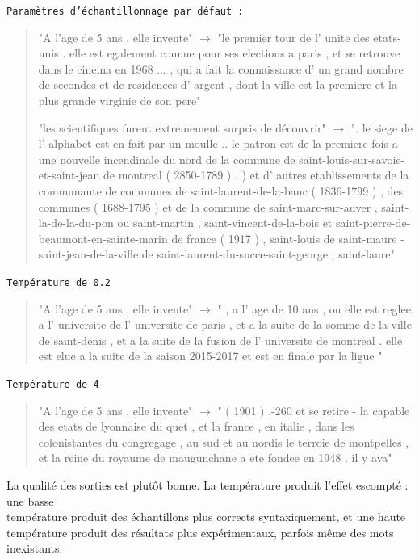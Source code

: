 \noindent{} \texttt{Paramètres d'échantillonnage par défaut :}

\begin{quotation}
"A l'age de 5 ans , elle invente" $\rightarrow$ "le premier tour de l' unite des etats-unis . elle est egalement connue pour ses elections a paris , et se retrouve dans le cinema en 1968 ... , qui a fait la connaissance d' un grand nombre de secondes et de residences d' argent , dont la ville est la premiere et la plus grande virginie de son pere"


"les scientifiques furent extremement surpris de découvrir" $\rightarrow$ ". le siege de l' alphabet est en fait par un moulle .. le patron est de la premiere fois a une nouvelle incendinale du nord de la commune de saint-louis-sur-savoie-et-saint-jean de montreal ( 2850-1789 ) . ) et d' autres etablissements de la communaute de communes de saint-laurent-de-la-banc ( 1836-1799 ) , des communes ( 1688-1795 ) et de la commune de saint-marc-sur-auver , saint-la-de-la-du-pon ou saint-martin , saint-vincent-de-la-bois et saint-pierre-de-beaumont-en-sainte-marin de france ( 1917 ) , saint-louis de saint-maure - saint-jean-de-la-ville de saint-laurent-du-succe-saint-george , saint-laure"
\end{quotation}

\noindent{} \texttt{Température de 0.2}

\begin{quotation}
"A l'age de 5 ans , elle invente" $\rightarrow$ " , a l' age de 10 ans , ou elle est reglee a l' universite de l' universite de paris , et a la suite de la somme de la ville de saint-denis , et a la suite de la fusion de l' universite de montreal . elle est elue a la suite de la saison 2015-2017 et est en finale par la ligue "
\end{quotation}

\noindent{} \texttt{Température de 4}

\begin{quotation}
"A l'age de 5 ans , elle invente" $\rightarrow$ " ( 1901 ) .-260 et se retire - la capable des etats de lyonnaise du quet , et la france , en italie , dans les colonistantes du congregage , au sud et au nordis le terroie de montpelles , et la reine du royaume de maugunchane a ete fondee en 1948 . il y ava"
\end{quotation}

La qualité des sorties est plutôt bonne. La température produit l'effet
escompté : une basse \\
température produit des échantillons plus corrects
syntaxiquement, et une haute température produit des résultats plus
expérimentaux, parfois même des mots inexistants. \\

